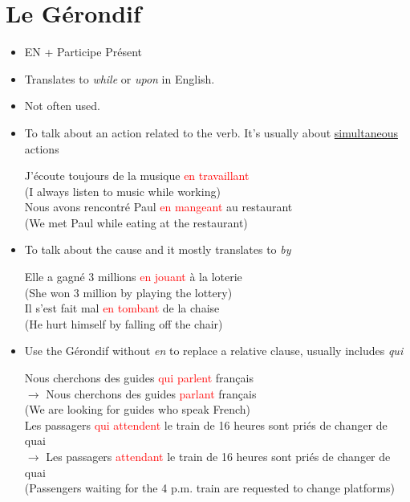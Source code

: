 \documentclass{book}
\begin{document}
    \section{Le Gérondif}
        \begin{itemize}
            \item EN + Participe Présent
            \item Translates to \textit{while} or \textit{upon} in English.
            \item Not often used.
            \item To talk about an action related to the verb. It's usually about \underline{simultaneous} actions
                \begin{center}
                    J'écoute toujours de la musique \textcolor{red}{en travaillant} \\
                    (I always listen to music while working) \\
                    Nous avons rencontré Paul \textcolor{red}{en mangeant} au restaurant \\ 
                    (We met Paul while eating at the restaurant)
                \end{center}
            \item To talk about the cause and it mostly translates to \textit{by}
                \begin{center}
                    Elle a gagné 3 millions \textcolor{red}{en jouant} à la loterie \\
                    (She won 3 million by playing the lottery) \\
                    Il s'est fait mal \textcolor{red}{en tombant} de la chaise \\
                    (He hurt himself by falling off the chair)
                \end{center}
            \item Use the Gérondif without \textit{en} to replace a relative clause, usually includes \textit{qui}
                \begin{center}
                    Nous cherchons des guides \textcolor{red}{qui parlent} français \\
                    $\rightarrow$ Nous cherchons des guides \textcolor{red}{parlant} français \\
                    (We are looking for guides who speak French) \\
                    Les passagers \textcolor{red}{qui attendent} le train de 16 heures sont priés de changer de quai \\
                    $\rightarrow$ Les passagers \textcolor{red}{attendant} le train de 16 heures sont priés de changer de quai \\
                    (Passengers waiting for the 4 p.m. train are requested to change platforms)
                \end{center}
        \end{itemize}
\end{document}
